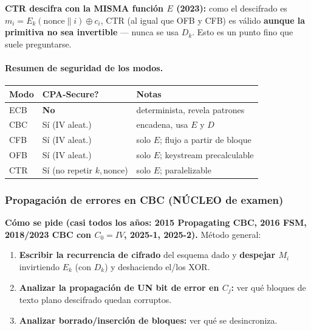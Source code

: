\documentclass[../main.tex]{subfiles}
\begin{document}
\begin{examen}
\textbf{CTR descifra con la MISMA función $E$ (2023):} como el descifrado es
$m_i = E_k(\text{nonce}\|i)\oplus c_i$, CTR (al igual que OFB y CFB) es válido
\textbf{aunque la primitiva no sea invertible} — nunca se usa $D_k$. Esto es un
punto fino que suele preguntarse.
\end{examen}

\paragraph{Resumen de seguridad de los modos.}
\begin{center}
\begin{tabular}{@{}lll@{}}
\toprule
\textbf{Modo} & \textbf{CPA-Secure?} & \textbf{Notas} \\
\midrule
ECB & \textbf{No} & determinista, revela patrones \\
CBC & Sí (IV aleat.) & encadena, usa $E$ y $D$ \\
CFB & Sí (IV aleat.) & solo $E$; flujo a partir de bloque \\
OFB & Sí (IV aleat.) & solo $E$; keystream precalculable \\
CTR & Sí (no repetir $k,\text{nonce}$) & solo $E$; paralelizable \\
\bottomrule
\end{tabular}
\end{center}

\subsubsection{Propagación de errores en CBC (NÚCLEO de examen)}

\begin{examen}
\textbf{Cómo se pide (casi todos los años: 2015 Propagating CBC, 2016 FSM,
2018/2023 CBC con $C_0=IV$, 2025-1, 2025-2).} Método general:
\begin{enumerate}
  \item \textbf{Escribir la recurrencia de cifrado} del esquema dado y
        \textbf{despejar $M_i$} invirtiendo $E_k$ (con $D_k$) y deshaciendo
        el/los XOR.
  \item \textbf{Analizar la propagación de UN bit de error en $C_j$:} ver qué
        bloques de texto plano descifrado quedan corruptos.
  \item \textbf{Analizar borrado/inserción de bloques:} ver qué se
        desincroniza.
\end{enumerate}
\end{examen}
\end{document}
